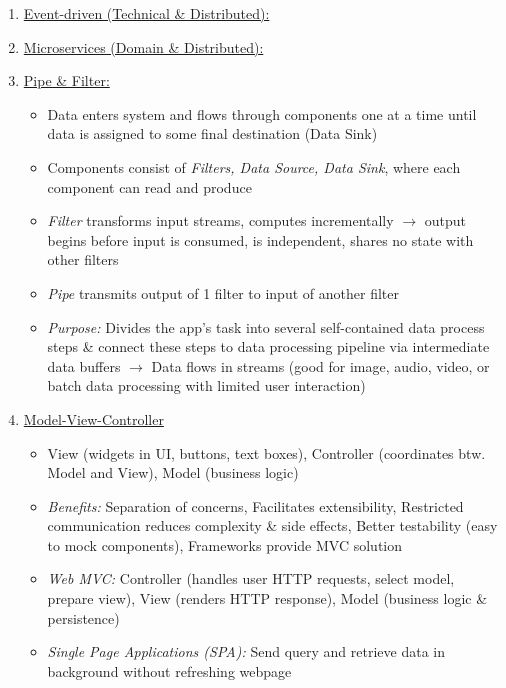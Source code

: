\documentclass[landscape]{article}
\begin{document}
\begin{multicols*}{5}
\begin{itemize}
\begin{enumerate}
        \item \underline{Event-driven (Technical \& Distributed):}
        \item \underline{Microservices (Domain \& Distributed):}
        \item \underline{Pipe \& Filter:}
        \begin{itemize}
          \item Data enters system and flows through components one at a time until data is assigned to some final destination (Data Sink)
          \item Components consist of \textit{Filters, Data Source, Data Sink}, where each component can read and produce
          \item \textit{Filter} transforms input streams, computes incrementally $\rightarrow$ output begins before input is consumed, is independent, shares no state with other filters
          \item \textit{Pipe} transmits output of 1 filter to input of another filter
          \item \textit{Purpose:} Divides the app's task into several self-contained data process steps \& connect these steps to data processing pipeline via intermediate data buffers $\rightarrow$ Data flows in streams (good for image, audio, video, or batch data processing with limited user interaction)
        \end{itemize}
        \item \underline{Model-View-Controller}
        \begin{itemize}
          \item View (widgets in UI, buttons, text boxes), Controller (coordinates btw. Model and View), Model (business logic)
          \item \textit{Benefits:} Separation of concerns, Facilitates extensibility, Restricted communication reduces complexity \& side effects, Better testability (easy to mock components), Frameworks provide MVC solution
          \item \textit{Web MVC:} Controller (handles user HTTP requests, select model, prepare view), View (renders HTTP response), Model (business logic \& persistence)
          \item \textit{Single Page Applications (SPA):} Send query and retrieve data in background without refreshing webpage
        \end{itemize}
      \end{enumerate}
    \end{itemize}


\end{multicols*}
\end{document}

